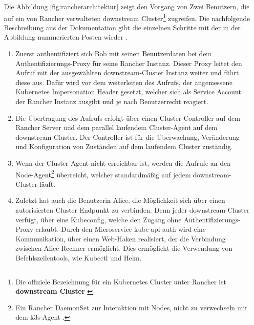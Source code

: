 Die Abbildung \ref*{fig:rancherarchitektur} zeigt den Vorgang von Zwei Benutzern, 
die auf ein von Rancher verwalteten downstream Cluster\footnote{Die offiziele Bezeichnung für ein Kubernetes Cluster unter Rancher ist \textbf{downstream Cluster} \cite{rancherArchitectureRecommendations}} zugreifen.
Die nachfolgende Beschreibung aus der Dokumentation gibt die einzelnen Schritte mit der in der Abbildung nummerierten Posten wieder \cite{rancherArchitecture}.
\begin{enumerate}
\item Zuerst authentifiziert sich Bob mit seinen Benutzerdaten bei dem Authentifizierungs-Proxy für seine Rancher Instanz.
Dieser Proxy leitet den Aufruf mit der ausgewählten downstream-Cluster Instanz weiter und führt diese aus.
Dafür wird vor dem weiterleiten des Aufrufs, der angemessene Kubernetes Impersonation Header gesetzt, 
welcher sich als Service Account der Rancher Instanz ausgibt und je nach Benutzerrecht reagiert.   
\item Die Übertragung des Aufrufs erfolgt über einen Cluster-Controller auf dem Rancher Server
und dem parallel laufendem Cluster-Agent auf dem downstream-Cluster. Der Controller ist für die Überwachung, Veränderung
und Konfiguration von Zuständen auf dem laufendem Cluster zuständig. 
\item Wenn der Cluster-Agent nicht erreichbar ist,
werden die Aufrufe an den Node-Agent\footnote{Ein Rancher DaemonSet zur Interaktion mit Nodes, 
nicht zu verwechseln mit dem k3s-Agent \cite{rancherAgents}. } überreicht, welcher standardmäßig auf jedem downstream-Cluster läuft.
\item Zuletzt hat auch die Benutzerin Alice, die Möglichkeit sich über einen autorisierten Cluster Endpunkt zu verbinden.
Denn jeder downstream-Cluster verfügt, über eine Kubeconfig, welche den Zugang ohne Authentifizierungs-Proxy erlaubt.
Durch den Microservice kube-api-auth wird eine Kommunikation, über einen Web-Haken realisiert, der die Verbindung
zwischen Alice Rechner ermöglicht. 
Dies ermöglicht die Verwendung von Befehlszeilentools, wie Kubectl und Helm.
\end{enumerate}

